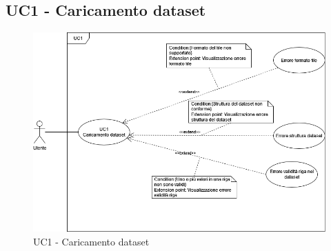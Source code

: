 \subsection{UC1 - Caricamento dataset}
\begin{figure}[h!]
    \centering
    \includegraphics[scale=0.55]{../../assets/Caricamento_dataset.png}
    \caption{UC1 - Caricamento dataset}
\end{figure}
